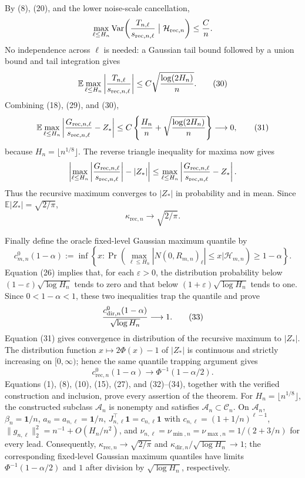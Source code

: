 By (8), (20), and the lower noise-scale cancellation,
\[
 \max_{\ell\leq H_n}
 \operatorname{Var}\!\left(
 {T_{n,\ell}\over s_{\mathrm{rec},n,\ell}}
 \mathrel{\big|}\mathcal H_{\mathrm{rec},n}\right)
 \leq {C\over n}.
\]
No independence across \(\ell\) is needed: a Gaussian tail bound followed by a union bound and tail integration gives
\[
 \mathbb E\max_{\ell\leq H_n}
 \left|{T_{n,\ell}\over s_{\mathrm{rec},n,\ell}}\right|
 \leq C\sqrt{{\log(2H_n)\over n}}.
 \tag{30}
\]
Combining (18), (29), and (30),
\[
 \mathbb E\max_{\ell\leq H_n}
 \left|{G_{\mathrm{rec},n,\ell}\over s_{\mathrm{rec},n,\ell}}-Z_*\right|
 \leq C\left\{{H_n\over n}
       +\sqrt{{\log(2H_n)\over n}}\right\}\longrightarrow0,
 \tag{31}
\]
because \(H_n=\lfloor n^{1/8}\rfloor\).  The reverse triangle inequality for maxima now gives
\[
 \left|\max_{\ell\leq H_n}
 \left|{G_{\mathrm{rec},n,\ell}\over s_{\mathrm{rec},n,\ell}}\right|-|Z_*|\right|
 \leq\max_{\ell\leq H_n}
 \left|{G_{\mathrm{rec},n,\ell}\over s_{\mathrm{rec},n,\ell}}-Z_*\right|.
\]
Thus the recursive maximum converges to \(|Z_*|\) in probability and in mean.  Since \(\mathbb E|Z_*|=\sqrt{2/\pi}\),
\[
 \kappa_{\mathrm{rec},n}\longrightarrow\sqrt{2/\pi}.
 \tag{32}
\]

Finally define the oracle fixed-level Gaussian maximum quantile by
\[
 c^0_{m,n}(1-\alpha)
 :=\inf\left\{x:\Pr\!\left(
 \max_{\ell\leq H_n}|N(0,R_{m,n})_\ell|\leq x
 \mathrel{\big|}\mathcal H_{m,n}\right)\geq1-\alpha\right\}.
\]
Equation (26) implies that, for each \(\varepsilon>0\), the distribution probability below \((1-\varepsilon)\sqrt{\log H_n}\) tends to zero and that below \((1+\varepsilon)\sqrt{\log H_n}\) tends to one.  Since \(0<1-\alpha<1\), these two inequalities trap the quantile and prove
\[
 {c^0_{\mathrm{dir},n}(1-\alpha)\over\sqrt{\log H_n}}
 \longrightarrow1.
 \tag{33}
\]
Equation (31) gives convergence in distribution of the recursive maximum to \(|Z_*|\).  The distribution function \(x\mapsto2\Phi(x)-1\) of \(|Z_*|\) is continuous and strictly increasing on \([0,\infty)\); hence the same quantile trapping argument gives
\[
 c^0_{\mathrm{rec},n}(1-\alpha)
 \longrightarrow\Phi^{-1}(1-\alpha/2).
 \tag{34}
\]
Equations (1), (8), (10), (15), (27), and (32)--(34), together with the verified construction and inclusion, prove every assertion of the theorem.
For \(H_n=\lfloor n^{1/8}\rfloor\), the constructed subclass \(\mathcal A_n\) is nonempty and satisfies \(\mathcal A_n\subset\mathcal C_n\). On \(\mathcal A_n\), \(\beta_n=\boldsymbol 1/n\), \(a_n=a_{n,\ell}=\boldsymbol 1/n\), \(J_{n,\ell}^{\top}\boldsymbol 1=c_{n,\ell}\boldsymbol 1\) with \(c_{n,\ell}=(1+1/n)^{\ell-1}\), \(\|g_{n,\ell}\|_2^2=n^{-1}+O(H_n/n^2)\), and \(\nu_{n,\ell}=\nu_{\min,n}=\nu_{\max,n}=1/(2+3/n)\) for every lead. Consequently, \(\kappa_{\mathrm{rec},n}\to\sqrt{2/\pi}\) and \(\kappa_{\mathrm{dir},n}/\sqrt{\log H_n}\to1\); the corresponding fixed-level Gaussian maximum quantiles have limits \(\Phi^{-1}(1-\alpha/2)\) and \(1\) after division by \(\sqrt{\log H_n}\), respectively.

